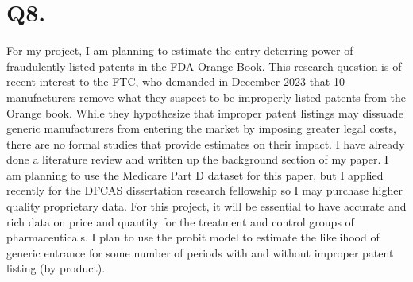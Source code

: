 \documentclass{article}
\begin{document}
\section*{Q8.}
For my project, I am planning to estimate the entry deterring power of fraudulently listed patents in the FDA Orange Book. This research question is of recent interest to the FTC, who demanded in December 2023 that 10 manufacturers remove what they suspect to be improperly listed patents from the Orange book. While they hypothesize that improper patent listings may dissuade generic manufacturers from entering the market by imposing greater legal costs, there are no formal studies that provide estimates on their impact. I have already done a literature review and written up the background section of my paper. I am planning to use the Medicare Part D dataset for this paper, but I applied recently for the DFCAS dissertation research fellowship so I may purchase higher quality proprietary data. For this project, it will be essential to have accurate and rich data on price and quantity for the treatment and control groups of pharmaceuticals. I plan to use the probit model to estimate the likelihood of generic entrance for some number of periods with and without improper patent listing (by product).
\end{document}
